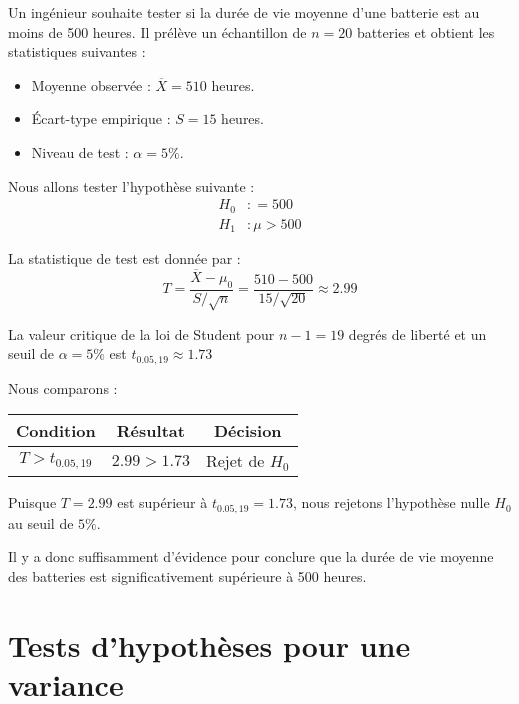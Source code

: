 \begin{example}
    Un ingénieur souhaite tester si la durée de vie moyenne d'une batterie est au moins de 500 heures.
    Il prélève un échantillon de $n = 20$ batteries et obtient les statistiques suivantes :
    \begin{itemize}
        \item Moyenne observée : $\overline{X} = 510$ heures.
        \item Écart-type empirique : $S = 15$ heures.
        \item Niveau de test : $\alpha = 5\%$.
    \end{itemize}
    Nous allons tester l'hypothèse suivante :
    \begin{align*}
        H_0 &: = 500 \\
        H_1 &: \mu > 500
    \end{align*}

    La statistique de test est donnée par :
        \[ T = \frac{\overline{X} - \mu_0}{S / \sqrt{n}} = \frac{510 - 500}{15 / \sqrt{20}} \approx 2.99 \] 

    La valeur critique de la loi de Student pour $n-1 = 19$ degrés de liberté et un seuil de $\alpha = 5\%$ est $ t_{0.05,19} \approx 1.73$

    Nous comparons :
    \begin{center}
        \begin{tabular}{ccc}
            \hline
            Condition & Résultat & Décision \\
            \hline
            $T > t_{0.05,19}$ & $2.99 > 1.73$ & Rejet de $H_0$ \\
            \hline
        \end{tabular}
    \end{center}

    Puisque $T = 2.99$ est supérieur à $t_{0.05,19} = 1.73$, nous rejetons l'hypothèse nulle $H_0$ au seuil de $5\%$.

    Il y a donc suffisamment d'évidence pour conclure que la durée de vie moyenne des batteries est significativement supérieure à 500 heures.
\end{example}




\section{Tests d'hypothèses pour une variance}

